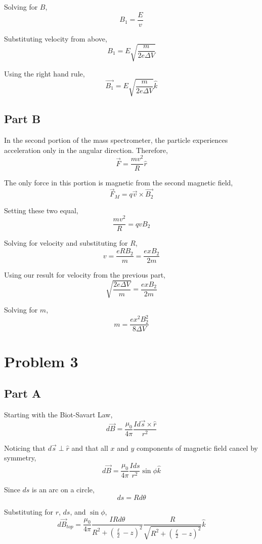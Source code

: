 \documentclass{article}
\begin{document}
Solving for $B$,
$$ B_{1} = \frac{ E }{ v } $$

Substituting velocity from above,
$$ B_{1} = E \sqrt{\frac{ m }{ 2 e \Delta V }} $$

Using the right hand rule,
$$ \vec{B_{1}} = E \sqrt{\frac{ m }{ 2 e \Delta V }} \hat{k} $$

\subsection*{Part B}

In the second portion of the mass spectrometer, the particle experiences
acceleration only in the angular direction. Therefore,
$$ \vec{F} = \frac{ m v^{2} }{ R } \hat{r} $$

The only force in this portion is magnetic from the second magnetic field,
$$ \vec{F}_{M} = q \vec{v} \times \vec{B_{2}} $$

Setting these two equal,
$$ \frac{ m v^{2} }{ R } = q v B_{2}$$

Solving for velocity and substituting for $R$,
$$ v = \frac{ e R B_{2} }{ m } = \frac{ e x B_{2} }{ 2 m } $$

Using our result for velocity from the previous part,
$$ \sqrt{\frac{ 2 e \Delta V}{ m }} = \frac{ e x B_{2} }{ 2 m } $$

Solving for $m$,
$$ m = \frac{ e x^{2} B_{2}^{2} }{ 8 \Delta V } $$

\section*{Problem 3}

\subsection*{Part A}

Starting with the Biot-Savart Law,
$$ d\vec{B} = \frac{ \mu_{0} }{ 4 \pi } \frac{ I d\vec{s} \times \hat{r} }{ r^{2} } $$

Noticing that $d\vec{s} \perp \hat{r}$ and that all $x$ and $y$ components of
magnetic field cancel by symmetry,
$$ d\vec{B} = \frac{ \mu_{0} }{ 4 \pi } \frac{ I ds }{ r^{2} } \sin \phi \hat{k} $$

Since $ds$ is an arc on a circle,
$$ ds = R d\theta$$

Substituting for $r$, $ds$, and $\sin \phi$,
$$ d\vec{B}_{top} = \frac{ \mu_{0} }{ 4 \pi } \frac{ I R d\theta }{ R^{2} + \left(
\frac{ \ell }{ 2 } - z \right)^{2} } \frac{ R }{ \sqrt{R^{2} + \left( \frac{
\ell }{ 2 } - z \right)^{2}} } \hat{k}$$
\end{document}
